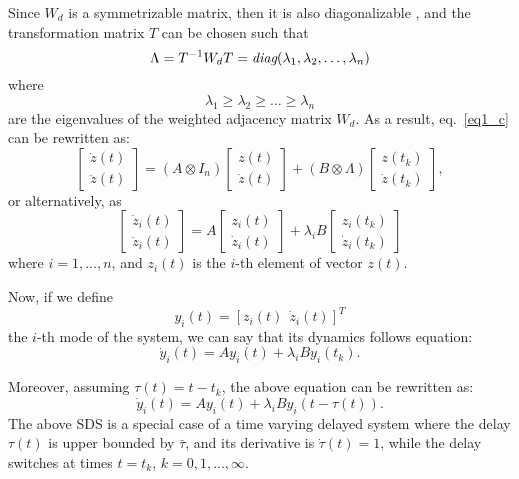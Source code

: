 \documentclass[conference]{IEEEtran}
\begin{document}
Since $W_d$ is a symmetrizable matrix, then it is also diagonalizable \cite{cepeda2011exact}, and the transformation matrix $T$ can be chosen such that $$\Lambda=T^{-1}W_d T=\emph{diag}(\lambda_1, \lambda_2, \ldots, \lambda_n)$$ where $$\lambda_1\geq \lambda_2\geq \ldots\geq \lambda_n$$ are the eigenvalues of the weighted adjacency matrix $W_d$.
As a result, eq.~\eqref{eq1_c} can be rewritten as:
$$\left[\begin{array}{c}
\dot{z}(t) \\
\ddot{z}(t)
\end{array} \right]=(A\otimes I_n )\left[\begin{array}{c}
{z}(t) \\
{\dot{z}}(t)
\end{array}\right]+(B\otimes \Lambda)\left[\begin{array}{c}
{z(t_k)} \\
{\dot{z}(t_k)}
\end{array}\right],$$
or alternatively, as
\begin{equation}
\left[\begin{array}{c}
\dot{z}_i(t) \\
\ddot{z}_i(t)
\end{array} \right]=A\left[\begin{array}{c}
{z}_i(t) \\
{\dot{z}}_i(t)
\end{array}\right]+\lambda_i B  \left[\begin{array}{c}
{z_i(t_k)} \\
{\dot{z}_i(t_k)}
\end{array}\right]
\end{equation}
where $i=1,\ldots,n$, and $z_i(t)$ is the $i$-th element of vector $z(t)$.

Now, if we define
\begin{equation}\label{def:mode}
y_i(t)=[z_i(t)\ \ \dot{z}_i(t)]^T
\end{equation}
the $i$-th {mode} of the system, we can say that its dynamics follows equation:
\begin{equation}\label{eq1}
\dot{y}_i(t)=Ay_i(t)+\lambda_i By_i(t_k).
\end{equation}

Moreover, assuming $\tau(t)=t-t_k$, the above equation can be rewritten as:
\begin{equation}\label{mode_dynamics}
\dot{y}_i(t)=Ay_i(t)+\lambda_i By_i(t-\tau(t)).
\end{equation}
The above SDS is a special case of a time varying delayed system where the delay $\tau(t)$ is upper bounded by $\bar{\tau}$, and its derivative is $\dot{\tau}(t)=1$, while the delay switches at times $t=t_k$, $k=0,1,\ldots, \infty$.
\end{document}
